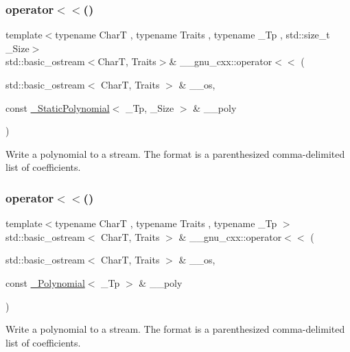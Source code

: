 \subsubsection{\texorpdfstring{operator$<$$<$()}{operator<<()}\hspace{0.1cm}{\footnotesize\ttfamily [2/3]}}
{\footnotesize\ttfamily template$<$typename CharT , typename Traits , typename \+\_\+\+Tp , std\+::size\+\_\+t \+\_\+\+Size$>$ \\
std\+::basic\+\_\+ostream$<$CharT, Traits$>$\& \+\_\+\+\_\+gnu\+\_\+cxx\+::operator$<$$<$ (\begin{DoxyParamCaption}\item[{std\+::basic\+\_\+ostream$<$ CharT, Traits $>$ \&}]{\+\_\+\+\_\+os,  }\item[{const \hyperlink{class____gnu__cxx_1_1__StaticPolynomial}{\+\_\+\+Static\+Polynomial}$<$ \+\_\+\+Tp, \+\_\+\+Size $>$ \&}]{\+\_\+\+\_\+poly }\end{DoxyParamCaption})}

Write a polynomial to a stream. The format is a parenthesized comma-\/delimited list of coefficients. \mbox{\label{namespace____gnu__cxx_ad713743dbfc30fba653621d1f7e99d3c}} 
\subsubsection{\texorpdfstring{operator$<$$<$()}{operator<<()}\hspace{0.1cm}{\footnotesize\ttfamily [3/3]}}
{\footnotesize\ttfamily template$<$typename CharT , typename Traits , typename \+\_\+\+Tp $>$ \\
std\+::basic\+\_\+ostream$<$ CharT, Traits $>$ \& \+\_\+\+\_\+gnu\+\_\+cxx\+::operator$<$$<$ (\begin{DoxyParamCaption}\item[{std\+::basic\+\_\+ostream$<$ CharT, Traits $>$ \&}]{\+\_\+\+\_\+os,  }\item[{const \hyperlink{class____gnu__cxx_1_1__Polynomial}{\+\_\+\+Polynomial}$<$ \+\_\+\+Tp $>$ \&}]{\+\_\+\+\_\+poly }\end{DoxyParamCaption})}

Write a polynomial to a stream. The format is a parenthesized comma-\/delimited list of coefficients. 

